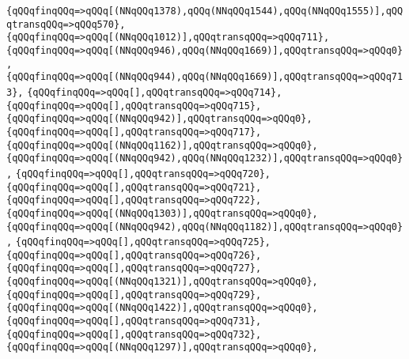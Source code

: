 \verb|{qQQqfinqQQq=>qQQq[(NNqQQq1378),qQQq(NNqQQq1544),qQQq(NNqQQq1555)],qQQqtransqQQq=>qQQq570},|\newline
\verb|{qQQqfinqQQq=>qQQq[(NNqQQq1012)],qQQqtransqQQq=>qQQq711},|\newline
\verb|{qQQqfinqQQq=>qQQq[(NNqQQq946),qQQq(NNqQQq1669)],qQQqtransqQQq=>qQQq0},|\newline
\verb|{qQQqfinqQQq=>qQQq[(NNqQQq944),qQQq(NNqQQq1669)],qQQqtransqQQq=>qQQq713},|\newline
\verb|{qQQqfinqQQq=>qQQq[],qQQqtransqQQq=>qQQq714},|\newline
\verb|{qQQqfinqQQq=>qQQq[],qQQqtransqQQq=>qQQq715},|\newline
\verb|{qQQqfinqQQq=>qQQq[(NNqQQq942)],qQQqtransqQQq=>qQQq0},|\newline
\verb|{qQQqfinqQQq=>qQQq[],qQQqtransqQQq=>qQQq717},|\newline
\verb|{qQQqfinqQQq=>qQQq[(NNqQQq1162)],qQQqtransqQQq=>qQQq0},|\newline
\verb|{qQQqfinqQQq=>qQQq[(NNqQQq942),qQQq(NNqQQq1232)],qQQqtransqQQq=>qQQq0},|\newline
\verb|{qQQqfinqQQq=>qQQq[],qQQqtransqQQq=>qQQq720},|\newline
\verb|{qQQqfinqQQq=>qQQq[],qQQqtransqQQq=>qQQq721},|\newline
\verb|{qQQqfinqQQq=>qQQq[],qQQqtransqQQq=>qQQq722},|\newline
\verb|{qQQqfinqQQq=>qQQq[(NNqQQq1303)],qQQqtransqQQq=>qQQq0},|\newline
\verb|{qQQqfinqQQq=>qQQq[(NNqQQq942),qQQq(NNqQQq1182)],qQQqtransqQQq=>qQQq0},|\newline
\verb|{qQQqfinqQQq=>qQQq[],qQQqtransqQQq=>qQQq725},|\newline
\verb|{qQQqfinqQQq=>qQQq[],qQQqtransqQQq=>qQQq726},|\newline
\verb|{qQQqfinqQQq=>qQQq[],qQQqtransqQQq=>qQQq727},|\newline
\verb|{qQQqfinqQQq=>qQQq[(NNqQQq1321)],qQQqtransqQQq=>qQQq0},|\newline
\verb|{qQQqfinqQQq=>qQQq[],qQQqtransqQQq=>qQQq729},|\newline
\verb|{qQQqfinqQQq=>qQQq[(NNqQQq1422)],qQQqtransqQQq=>qQQq0},|\newline
\verb|{qQQqfinqQQq=>qQQq[],qQQqtransqQQq=>qQQq731},|\newline
\verb|{qQQqfinqQQq=>qQQq[],qQQqtransqQQq=>qQQq732},|\newline
\verb|{qQQqfinqQQq=>qQQq[(NNqQQq1297)],qQQqtransqQQq=>qQQq0},|\newline
